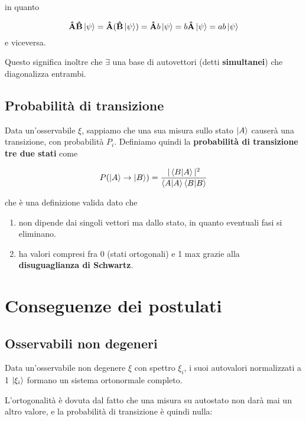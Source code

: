 in quanto

\begin{equation}
\mathbf{\hat A}\mathbf{\hat B}\ket{\psi}= \mathbf{\hat A}(\mathbf{\hat B}\ket{\psi})=\mathbf{\hat A}b\ket{\psi}=b\mathbf{\hat A}\ket{\psi}= ab\ket{\psi}
\end{equation}
 e viceversa. 
 
 Questo significa inoltre che $\exists$ una base di autovettori (detti \textbf{simultanei}) che diagonalizza entrambi.

\subsection{Probabilità di transizione} 

Data un'osservabile $\xi$, sappiamo che una sua misura sullo stato $\ket{A}$ causerà una transizione, con probabilità $P_i$. Definiamo quindi la \textbf{probabilità di transizione tre due stati} come

\begin{align}
P(\ket{A} \rightarrow \ket{B})= \frac{|\braket{B|A}|^2}{\braket{A|A}\braket{B|B}}
\end{align}

che è una definizione valida dato che

\begin{enumerate}
	\item non dipende dai singoli vettori ma dallo stato, in quanto eventuali fasi si eliminano.
	\item ha valori compresi fra 0 (stati ortogonali) e 1 max grazie alla \textbf{disuguaglianza di Schwartz}.
\end{enumerate}

\newpage
 
\section{Conseguenze dei postulati}
 
\subsection{Osservabili non degeneri}
 
Data un'osservabile non degenere $\xi$ con spettro $\xi_i$, i suoi autovalori normalizzati a 1 $\ket{\xi_i}$ formano un sistema ortonormale completo.

\bigskip

L'ortogonalità è dovuta dal fatto che una misura su autostato non darà mai un altro valore, e la probabilità di transizione è quindi nulla:

